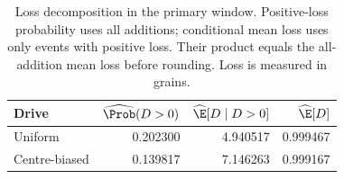 \begin{table}[htbp]
\centering
\small
\caption{Loss decomposition in the primary window. Positive-loss probability uses all additions; conditional mean loss uses only events with positive loss. Their product equals the all-addition mean loss before rounding. Loss is measured in grains.}
\label{tab:dissipation}
\begin{tabular}{@{}lrrr@{}}
\toprule
Drive & $\widehat{\Prob}(D>0)$ & $\widehat{\E}[D\mid D>0]$ & $\widehat{\E}[D]$\\
\midrule
Uniform & 0.202300 & 4.940517 & 0.999467\\
Centre-biased & 0.139817 & 7.146263 & 0.999167\\
\bottomrule
\end{tabular}
\end{table}

